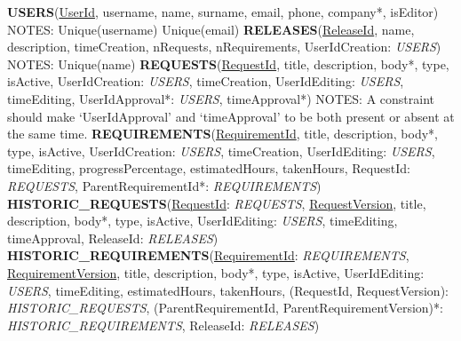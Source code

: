 \documentclass[12pt, a4paper]{report}
\begin{document}
\textbf{USERS}(\underline{UserId}, username, name, surname, email, phone, company*, isEditor)\newline
\newline
NOTES:\newline
Unique(username)\newline
Unique(email)\newline
\newline
\textbf{RELEASES}(\underline{ReleaseId}, name, description, timeCreation, nRequests, nRequirements,
UserIdCreation: \textit{USERS})\newline
\newline
NOTES:\newline
Unique(name)\newline
\newline
\textbf{REQUESTS}(\underline{RequestId}, title, description, body*, type, isActive, UserIdCreation: \textit{USERS}, timeCreation,
UserIdEditing: \textit{USERS}, timeEditing, UserIdApproval*: \textit{USERS}, timeApproval*)\newline
\newline
NOTES:\newline
A constraint should make `UserIdApproval' and `timeApproval' to be both present or absent at the same time.\newline
\newline
\textbf{REQUIREMENTS}(\underline{RequirementId}, title, description, body*, type, isActive, UserIdCreation: \textit{USERS},
timeCreation, UserIdEditing: \textit{USERS}, timeEditing, progressPercentage, estimatedHours, takenHours,
RequestId: \textit{REQUESTS}, ParentRequirementId*: \textit{REQUIREMENTS})\newline
\newline
\textbf{HISTORIC\_REQUESTS}(\underline{RequestId}: \textit{REQUESTS}, \underline{RequestVersion}, title, description, body*, type,
isActive, UserIdEditing: \textit{USERS}, timeEditing, timeApproval, ReleaseId: \textit{RELEASES})\newline
\newline
\textbf{HISTORIC\_REQUIREMENTS}(\underline{RequirementId}: \textit{REQUIREMENTS}, \underline{RequirementVersion}, title,
description, body*, type, isActive, UserIdEditing: \textit{USERS}, timeEditing, estimatedHours, takenHours,
(RequestId, RequestVersion): \textit{HISTORIC\_REQUESTS},
(ParentRequirementId, ParentRequirementVersion)*: \textit{HISTORIC\_REQUIREMENTS}, ReleaseId: \textit{RELEASES})

\end{document}
